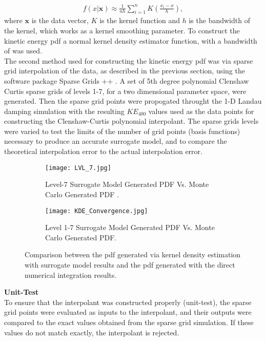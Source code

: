 \documentclass{article}
\begin{document}
\begin{align*}
f(x|\textbf{x}) \approx  \frac{1}{nh}\sum_{i=1}^n K(\frac{x_i - x}{h}),
\end{align*}
 where $\textbf{x}$ is the data vector, $K$ is the kernel function and $h$ is the bandwidth of the kernel, which works as a kernel smoothing parameter. To construct the kinetic energy pdf a normal kernel density estimator function, with a bandwidth of was used. \\

The second method used for constructing the kinetic energy pdf was via sparse grid interpolation of the data, as described in the previous section, using the software package Sparse Grids ++ \cite{garcke_sparse_2013}. A set of 5th degree polynomial Clenshaw Curtis sparse grids of levels 1-7, for a two dimensional parameter space, were generated. Then the sparse grid points were propogated throught the 1-D Landau damping simulation with the resulting $KE_{400}$ values used as the data points for constructing the Clenshaw-Curtis polynomial interpolant. The sparse grids levels were varied to test the limits of the number of grid points (basis functions) necessary to produce an accurate surrogate model, and to compare the theoretical interpolation error to the actual interpolation error.\\
\begin{figure}[h!]
	\begin{subfigure}[b]{0.5\linewidth}
		\texttt{[image: LVL\_7.jpg]}
			\caption{ Level-7 Surrogate Model Generated PDF Vs. Monte Carlo Generated PDF .}
		\end{subfigure}
		\begin{subfigure}[b]{0.5\linewidth}
			\texttt{[image: KDE\_Convergence.jpg]}
			\caption{Level 1-7 Surrogate Model Generated PDF Vs. Monte Carlo Generated PDF.}
		\end{subfigure}
		\caption{Comparison between the pdf generated via kernel density estimation with surrogate model results and the pdf generated with the direct numerical integration results.}
		\label{fig:error}
\end{figure}
\textbf{Unit-Test}\\
To ensure that the interpolant was constructed properly (unit-test), the sparse grid points were evaluated as inputs to the interpolant, and their outputs were compared to the exact values obtained from the sparse grid simulation. If these values do not match exactly, the interpolant is rejected.
\end{document}
